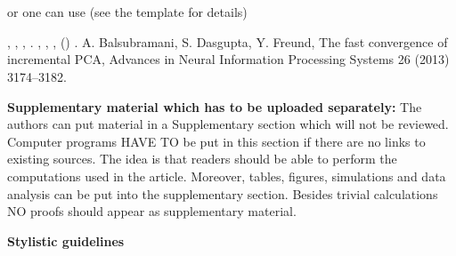 \documentclass[times,sort&compress,3p]{elsarticle}
\theoremstyle{plain}%
\theoremstyle{definition}
\begin{document}
%




%
\section*{}
or one can use (see the template for details)
\begin{thebibliography}{99}

, ,
  , .
, ,
  , 
   () .
  A. Balsubramani, S. Dasgupta, Y. Freund, \newblock The fast
convergence of incremental PCA, \newblock Advances in Neural Information
Processing Systems 26 (2013) 3174--3182.

\end{thebibliography}

\medskip

{\bf Supplementary material which has to be uploaded separately:} The authors can put material in a Supplementary section which will not be reviewed. Computer programs HAVE TO be put in this section if there are no links to existing sources. The idea is that readers should be able to perform the computations used in the article. Moreover, tables, figures, simulations and data analysis can be put into the supplementary section. Besides trivial calculations NO proofs should appear as supplementary material.

\newpage
\centerline{\Large{\textbf{Stylistic guidelines}}}
\end{document}
